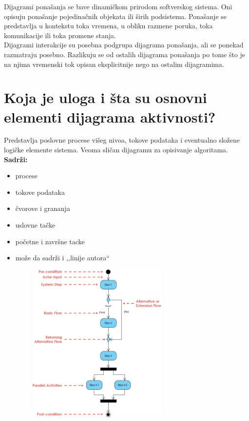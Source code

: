\documentclass[a4paper]{article}
\begin{document}
    Dijagrami ponašanja se bave dinamičkom prirodom softverskog sistema. Oni
  opisuju ponašanje pojedinačnih objekata ili širih podsistema. Ponašanje se
  predstavlja u kontekstu toka vremena, u obliku razmene poruka, toka komunikacije
  ili toka promene stanja. \\
  \indent Dijagrami interakcije su posebna podgrupa dijagrama ponašanja, ali se ponekad
  razmatraju posebno. Razlikuju se od ostalih dijagrama ponašanja po tome što je na
  njima vremenski tok opisan eksplicitnije nego na ostalim dijagramima.

\section{Koja je uloga i šta su osnovni elementi dijagrama aktivnosti?}
  Predstavlja poslovne procese višeg nivoa, tokove podataka i eventualno složene logičke elemente 
  sistema. Veoma sličan dijagramu za opisivanje algoritama. \\
  \textbf{Sadrži:}
  \begin{itemize}
    \item procese
    \item tokove podataka
    \item čvorove i grananja
    \item uslovne tačke
    \item početne i završne tacke
    \item može da sadrži i ,,linije autora``
  \end{itemize}
  \begin{figure}[H]
    \begin{center}
        \includegraphics[width=80mm,height=80mm]{Slike/uml_aktivnost.png}
    \end{center}
  \end{figure}  
\end{document}
